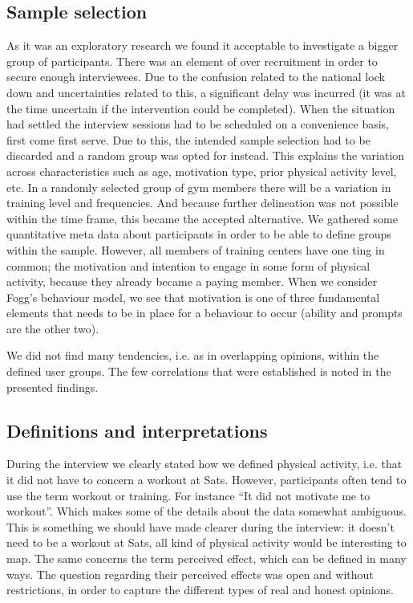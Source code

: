 \subsection{Sample selection}
As it was an exploratory research we found it acceptable to investigate a bigger group of participants. There was an element of over recruitment in order to secure enough interviewees. Due to the confusion related to the national lock down and uncertainties related to this, a significant delay was incurred (it was at the time uncertain if the intervention could be completed). When the situation had settled the interview sessions had to be scheduled on a convenience basis, first come first serve. Due to this, the intended sample selection had to be discarded and a random group was opted for instead. This explains the variation across characteristics such as age, motivation type, prior physical activity level, etc. In a randomly selected group of gym members there will be a variation in training level and frequencies. And because further delineation was not possible within the time frame, this became the accepted alternative. We gathered some quantitative meta data about participants in order to be able to define groups within the sample. However, all members of training centers have one ting in common; the motivation and intention to engage in some form of physical activity, because they already became a paying member. When we consider Fogg's behaviour model, we see that motivation is one of three fundamental elements that needs to be in place for a behaviour to occur (ability and prompts are the other two). 

We did not find many tendencies, i.e. as in overlapping opinions, within the defined user groups. The few correlations that were established is noted in the presented findings. 


\subsection{Definitions and interpretations }
During the interview we clearly stated how we defined physical activity, i.e. that it did not have to concern a workout at Sats. However, participants often tend to use the term workout or training. For instance “It did not motivate me to workout”. Which makes some of the details about the data somewhat ambiguous. This is something we should have made clearer during the interview: it doesn't need to be a workout at Sats, all kind of physical activity would be interesting to map. The same concerns the term perceived effect, which can be defined in many ways. The question regarding their perceived effects was open and without restrictions, in order to capture the different types of real and honest opinions.


